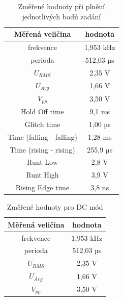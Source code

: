\begin{table}[h!]

\caption{Změřené hodnoty při plnění jednotlivých bodů zadání}
\centering
\begin{tabular}{ | c | c | } 
  \hline
  Měřená veličina & hodnota \\ 
  \hline
  frekvence &  1,953 kHz\\ 
  \hline
  perioda  &  512,03 µs\\ 
  \hline
  $U_{RMS}$ & 2,35 V \\ 
  \hline
  $U_{Avg}$ & 1,66 V \\ 
  \hline
  $V_{pp}$ &  3,50 V\\ 
  \hline
  Hold Off time & 9,1 ms \\ 
  \hline
  Glitch time   & 1,00 µs \\ 
  \hline
  Time (falling - falling) & 1,28 ms \\ 
  \hline
  Time (rising - rising)   & 255,9 µs \\ 
  \hline
  Runt Low  & 2,8 V \\ 
  \hline
  Runt High   & 3,9 V \\ 
  \hline
  Rising Edge time & 3,8 ns \\ 
  \hline
  
\end{tabular}
\label{table:2}
\end{table}

\begin{table}[h!]

\caption{Změřené hodnoty pro DC mód}
\centering
\begin{tabular}{ | c | c | } 
  \hline
  Měřená veličina & hodnota \\ 
  \hline
  frekvence &  1,953 kHz\\ 
  \hline
  perioda  &  512,03 µs\\ 
  \hline
  $U_{RMS}$ & 2,35 V \\ 
  \hline
  $U_{Avg}$ & 1,66 V \\ 
  \hline
  $V_{pp}$ &  3,50 V\\ 
  \hline
  
\end{tabular}
\label{table:3}
\end{table}

